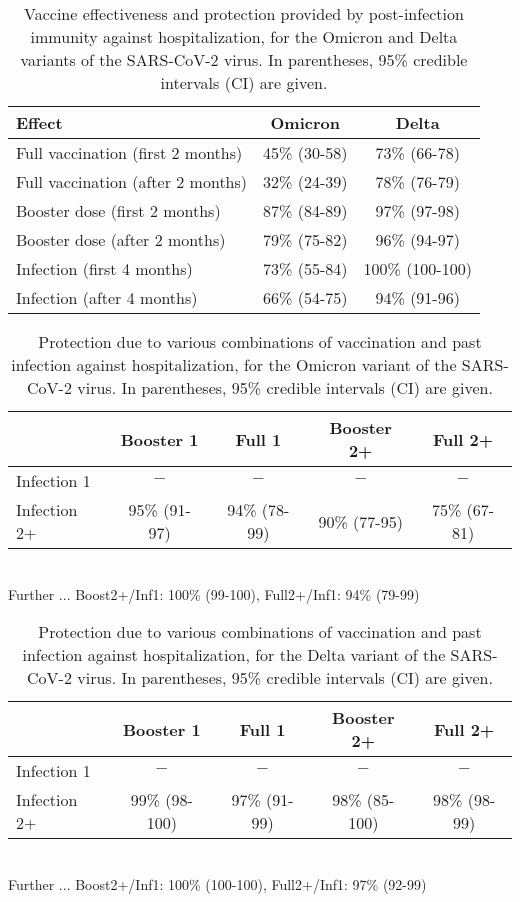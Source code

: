 \documentclass[preprint,12pt,authoryear]{elsarticle}
\begin{document}
\begin{table}[!h]
\caption{Vaccine effectiveness and protection provided by post-infection immunity against hospitalization, for the Omicron and Delta variants of the SARS-CoV-2 virus. In parentheses, 95\% credible intervals (CI) are given. \\[1ex]}
\label{tabHalone}
\centering
\begin{tabular}{lcc}
\hline
Effect & Omicron & Delta \\
\hline
Full vaccination (first 2 months) & 45\% (30-58) & 73\% (66-78) \\
Full vaccination (after 2 months) & 32\% (24-39) & 78\% (76-79) \\
Booster dose (first 2 months) & 87\% (84-89) & 97\% (97-98) \\
Booster dose (after 2 months) & 79\% (75-82) & 96\% (94-97) \\
Infection (first 4 months) & 73\% (55-84) & 100\% (100-100) \\
Infection (after 4 months) & 66\% (54-75) & 94\% (91-96) \\
\hline
\end{tabular}
\end{table}

\begin{table}[!h]
\caption{Protection due to various combinations of vaccination and past infection against hospitalization, for the Omicron variant of the SARS-CoV-2 virus. In parentheses, 95\% credible intervals (CI) are given. \\[1ex]}
\label{tabHOinteractions}
\centering
\begin{tabular}{lcccc}
\hline
 & Booster 1 & Full 1 & Booster 2+ & Full 2+ \\
\hline
Infection 1 & $-$ & $-$ & $-$ & $-$ \\
Infection 2+ & 95\% (91-97) & 94\% (78-99) & 90\% (77-95) & 75\% (67-81) \\
\hline
\end{tabular} \\[1ex]
Further ... Boost2+/Inf1: 100\% (99-100), Full2+/Inf1: 94\% (79-99)
\end{table}

\begin{table}[!h]
\caption{Protection due to various combinations of vaccination and past infection against hospitalization, for the Delta variant of the SARS-CoV-2 virus. In parentheses, 95\% credible intervals (CI) are given. \\[1ex]}
\label{tabHDinteractions}
\centering
\begin{tabular}{lcccc}
\hline
 & Booster 1 & Full 1 & Booster 2+ & Full 2+ \\
\hline
Infection 1 & $-$ & $-$ & $-$ & $-$ \\
Infection 2+ & 99\% (98-100) & 97\% (91-99) & 98\% (85-100) & 98\% (98-99) \\
\hline
\end{tabular} \\[1ex]
Further ... Boost2+/Inf1: 100\% (100-100), Full2+/Inf1: 97\% (92-99)
\end{table}
\end{document}
